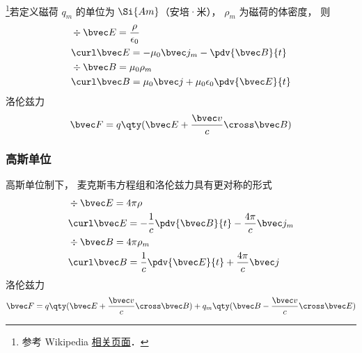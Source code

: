 
\begin{issues}
\issueDraft
\end{issues}


\footnote{参考 Wikipedia \href{https://en.wikipedia.org/wiki/Magnetic_monopole}{相关页面}．}若定义磁荷 $q_m$ 的单位为 $\Si{Am}$（安培·米）， $\rho_m$ 为磁荷的体密度， 则
\begin{align}
&\div \bvec E = \frac{\rho}{\epsilon_0}\\
&\curl \bvec E = - \mu_0 \bvec j_m -\pdv{\bvec B}{t}\\
&\div \bvec B = \mu_0 \rho_m \\
&\curl \bvec B = \mu_0 \bvec j + \mu_0\epsilon_0 \pdv{\bvec E}{t}
\end{align}
洛伦兹力
\begin{equation}
\bvec F = q \qty(\bvec E + \frac{\bvec v}{c}\cross \bvec B)
\end{equation}

\subsubsection{高斯单位}
高斯单位制下， 麦克斯韦方程组和洛伦兹力具有更对称的形式
\begin{align}
&\div \bvec E = 4\pi\rho\\
&\curl \bvec E = -\frac{1}{c}\pdv{\bvec B}{t}  - \frac{4\pi}{c}\bvec j_m\\
&\div \bvec B = 4\pi\rho_m \\
&\curl \bvec B = \frac{1}{c}\pdv{\bvec E}{t} + \frac{4\pi}{c} \bvec j
\end{align}
洛伦兹力
\begin{equation}
\bvec F = q \qty(\bvec E + \frac{\bvec v}{c}\cross \bvec B) + q_m \qty(\bvec B - \frac{\bvec v}{c}\cross \bvec E)
\end{equation}
